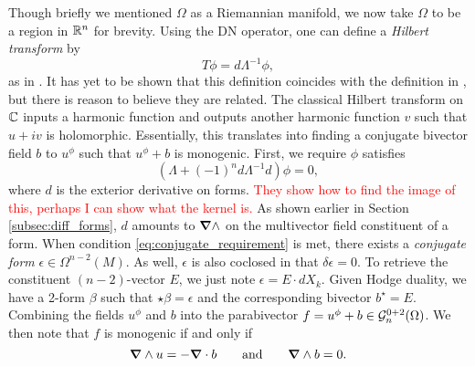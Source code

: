 Though briefly we mentioned $\Omega$ as a Riemannian manifold, we now take $\Omega$ to be a region in $\mathbb{R}^n$ for brevity. Using the DN operator, one can define a \emph{Hilbert transform} by
\[
T \phi  = d\Lambda^{-1} \phi,
\]
as in \cite{belishev_dirichlet_2008}. It has yet to be shown that this definition coincides with the definition in \cite{brackx_hilbert_2008}, but there is reason to believe they are related. The classical Hilbert transform on $\mathbb{C}$ inputs a harmonic function and outputs another harmonic function $v$ such that $u+iv$ is holomorphic. Essentially, this translates into finding a conjugate bivector field $b$ to $u^\phi$ such that $u^\phi +b$ is monogenic. First, we require $\phi$ satisfies
\begin{equation}
\label{eq:conjugate_requirement}
\left( \Lambda + (-1)^{n}d\Lambda^{-1}d\right)\phi = 0,
\end{equation}
where $d$ is the exterior derivative on forms. \textcolor{red}{They show how to find the image of this, perhaps I can show what the kernel is.} As shown earlier in Section \ref{subsec:diff_forms}, $d$ amounts to $\boldsymbol{\nabla} \wedge$ on the multivector field constituent of a form.  When condition \ref{eq:conjugate_requirement} is met, there exists a \emph{conjugate form} $\epsilon \in \Omega^{n-2}(M)$. As well, $\epsilon$ is also coclosed in that $\delta \epsilon=0$. To retrieve the constituent $(n-2)$-vector $E$, we just note $\epsilon = E \cdot dX_k$. Given Hodge duality, we have a 2-form $\beta$ such that $\star\beta = \epsilon$ and the corresponding bivector $b^\star=E$.  Combining the fields $u^\phi$ and $b$ into the parabivector $f=u^\phi+b \in \mathcal{G}_n^{0+2}(\Omega)$. We then note that $f$ is monogenic if and only if
\[
\boldsymbol{\nabla} \wedge u = -\boldsymbol{\nabla} \cdot b \qquad \textrm{and} \qquad \boldsymbol{\nabla} \wedge b = 0.
\]


